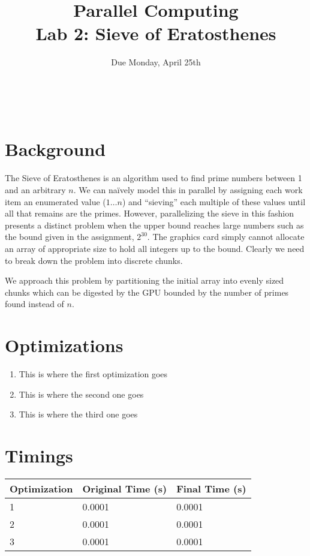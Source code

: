 \documentclass[12pt]{article}
\title{ Parallel Computing \\ Lab 2: Sieve of Eratosthenes }
\author{\MyFullName}
\date{ Due Monday, April 25th }
\begin{document}
\maketitle
\thispagestyle{empty}
\begin{center}
\end{center}
\setcounter{page}{0}
\newpage

\def\thesection{\Roman{section}.}
\hfill \\
\section{ Background }

\paragraph{}The Sieve of Eratosthenes is an algorithm used to find prime numbers between 1 and an arbitrary $n$. We can naïvely model this in parallel by assigning each work item an enumerated value ($1\ldots n$) and ``sieving'' each multiple of these values until all that remains are the primes. However, parallelizing the sieve in this fashion presents a distinct problem when the upper bound reaches large numbers such as the bound given in the assignment, $2^{30}$.  The graphics card simply cannot allocate an array of appropriate size to hold all integers up to the bound. Clearly we need to break down the problem into discrete chunks.

We approach this problem by partitioning the initial array into evenly sized chunks which can be digested by the GPU bounded by the number of primes found instead of $n$. 

\section{ Optimizations }
\begin{enumerate}[1.]
\item This is where the first optimization goes

\item This is where the second one goes

\item This is where the third one goes
\end{enumerate}

\section{ Timings }

\begin{center}
    \begin{tabular}{ | l | l | l |}
	\hline
   	Optimization & Original Time (s) & Final Time (s) \\ \hline
    	1 & 0.0001 & 0.0001 \\ \hline
	2 & 0.0001 & 0.0001 \\ \hline
	3 & 0.0001 & 0.0001 \\  \hline
    \end{tabular}
\end{center}
\end{document}
